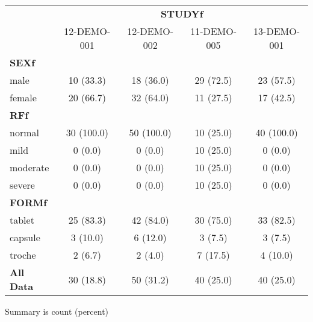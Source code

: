 {\def\arraystretch{1.4}\tabcolsep=5pt
\begin{threeparttable}
\begin{tabular}[h]{lcccc}
\hline
\multicolumn{1}{c}{} & \multicolumn{4}{c}{\textbf{STUDYf}}\\
\cmidrule(lr){2-5}
\ & 12-DEMO-001 & 12-DEMO-002 & 11-DEMO-005 & 13-DEMO-001 \\
\hline
\multicolumn{5}{l}{\textbf{SEXf}}\\
male & 10 (33.3) & 18 (36.0) & 29 (72.5) & 23 (57.5) \\
female & 20 (66.7) & 32 (64.0) & 11 (27.5) & 17 (42.5) \\
\hline \multicolumn{5}{l}{\textbf{RFf}}\\
normal & 30 (100.0) & 50 (100.0) & 10 (25.0) & 40 (100.0) \\
mild & 0 (0.0) & 0 (0.0) & 10 (25.0) & 0 (0.0) \\
moderate & 0 (0.0) & 0 (0.0) & 10 (25.0) & 0 (0.0) \\
severe & 0 (0.0) & 0 (0.0) & 10 (25.0) & 0 (0.0) \\
\hline \multicolumn{5}{l}{\textbf{FORMf}}\\
tablet & 25 (83.3) & 42 (84.0) & 30 (75.0) & 33 (82.5) \\
capsule & 3 (10.0) & 6 (12.0) & 3 (7.5) & 3 (7.5) \\
troche & 2 (6.7) & 2 (4.0) & 7 (17.5) & 4 (10.0) \\ \hline
\textbf{All Data} & 30 (18.8) & 50 (31.2) & 40 (25.0) & 40 (25.0) \\
\hline
\end{tabular}
\begin{tablenotes}[flushleft]
\item Summary is count (percent)
\end{tablenotes}
\end{threeparttable}
}
